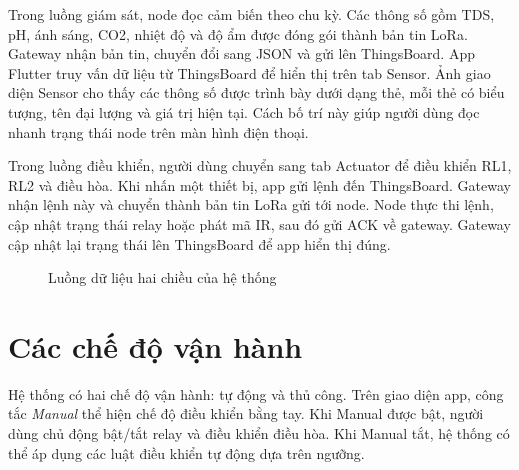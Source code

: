 Trong luồng giám sát, node đọc cảm biến theo chu kỳ. Các thông số gồm TDS, pH, ánh sáng, CO2, nhiệt độ và độ ẩm được đóng gói thành bản tin LoRa. Gateway nhận bản tin, chuyển đổi sang JSON và gửi lên ThingsBoard. App Flutter truy vấn dữ liệu từ ThingsBoard để hiển thị trên tab Sensor. Ảnh giao diện Sensor cho thấy các thông số được trình bày dưới dạng thẻ, mỗi thẻ có biểu tượng, tên đại lượng và giá trị hiện tại. Cách bố trí này giúp người dùng đọc nhanh trạng thái node trên màn hình điện thoại.

Trong luồng điều khiển, người dùng chuyển sang tab Actuator để điều khiển RL1, RL2 và điều hòa. Khi nhấn một thiết bị, app gửi lệnh đến ThingsBoard. Gateway nhận lệnh này và chuyển thành bản tin LoRa gửi tới node. Node thực thi lệnh, cập nhật trạng thái relay hoặc phát mã IR, sau đó gửi ACK về gateway. Gateway cập nhật lại trạng thái lên ThingsBoard để app hiển thị đúng.

\begin{figure}[h!]
    \centering
    \caption{Luồng dữ liệu hai chiều của hệ thống}
    \label{fig:data_control_flow}
\end{figure}

\section{Các chế độ vận hành}
Hệ thống có hai chế độ vận hành: tự động và thủ công. Trên giao diện app, công tắc \textit{Manual} thể hiện chế độ điều khiển bằng tay. Khi Manual được bật, người dùng chủ động bật/tắt relay và điều khiển điều hòa. Khi Manual tắt, hệ thống có thể áp dụng các luật điều khiển tự động dựa trên ngưỡng.

